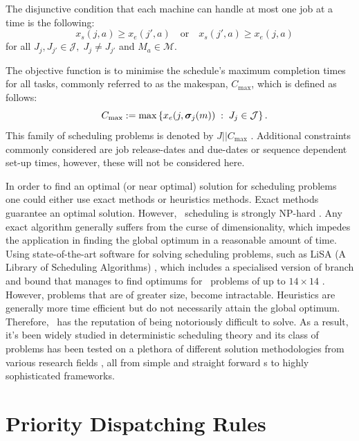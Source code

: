 \documentclass[twocolumn]{svjour3}
\begin{document}
The disjunctive condition that each machine can handle at most one job at a 
time is the following:
\begin{equation}\quad\label{eq:oneJobPerMac}
x_s(j,a) \geq x_e(j',a) \quad\textrm{or}\quad x_s(j',a) \geq x_e(j,a)  
\end{equation}
for all $J_j,J_{j'}\in\mathcal{J},\; J_j\neq J_{j'}$ and $M_a\in\mathcal{M}$. 

The objective function is to minimise the schedule's maximum completion times 
for all tasks, commonly referred to as the makespan, $C_{\max}$, which is 
defined as follows:
\begin{equation}\quad
C_{\max} := 
\max\left\{x_e(j,\bm \sigma_j(m))\;:\;J_j\in\mathcal{J}\right\}.\label{eq:makespan}
\end{equation} 
This family of scheduling problems is denoted by $J||C_{\max}$ 
\cite{Pinedo08}.
Additional constraints commonly considered are job release-dates and due-dates 
or sequence dependent set-up times, however, these will not be considered here. 

In order to find an optimal (or near optimal) solution for scheduling problems 
one could either use exact methods or heuristics methods. Exact methods 
guarantee an optimal solution. However, \jsp\ scheduling is strongly NP-hard 
\cite{Garey76:NPhard}. Any exact algorithm generally suffers from the curse of 
dimensionality, which impedes the application in finding the global optimum in 
a reasonable amount of time. 
Using state-of-the-art software for solving scheduling problems, such as 
LiSA %
(A Library of Scheduling Algorithms) \cite{LiSA}, which includes a specialised 
version of branch and bound that manages to find optimums for \jsp\ problems of 
up to $14\times14$ \cite{Ru12}. However, problems that are of greater size, 
become intractable. 
Heuristics are generally more time efficient but 
do not necessarily attain the global optimum. Therefore, \jsp\ has the 
reputation of being notoriously difficult to solve. 
As a result, it's been widely studied in deterministic scheduling theory and 
its class of problems has been tested on a plethora of different solution 
methodologies from various research fields \cite{Meeran12}, all from simple and 
straight forward \dr s to highly sophisticated frameworks.


\section{Priority Dispatching Rules} \label{sec:DR}
\end{document}
